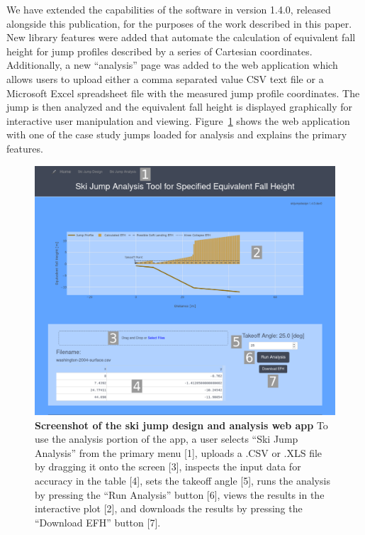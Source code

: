\documentclass[smallextended]{svjour3}       %
\begin{document}
We have extended the capabilities of the software in version 1.4.0, released
alongside this publication, for the purposes of the work described in this
paper. New library features were added that automate the calculation of
equivalent fall height for jump profiles described by a series of Cartesian
coordinates. Additionally, a new ``analysis'' page was added to the web
application which allows users to upload either a comma separated value CSV
text file or a Microsoft Excel spreadsheet file with the measured jump profile
coordinates. The jump is then analyzed and the equivalent fall height is
displayed graphically for interactive user manipulation and viewing.
Figure~\ref{fig:web-app-screenshot} shows the web application with one of the
case study jumps loaded for analysis and explains the primary features.
%
\begin{figure}
  \centering
  \includegraphics[width=\textwidth]{figures/web-app-screenshot.png}
  \caption{\textbf{Screenshot of the ski jump design and analysis web app} To
    use the analysis portion of the app, a user selects ``Ski Jump Analysis''
    from the primary menu [1], uploads a .CSV or .XLS file by dragging it onto
    the screen [3], inspects the input data for accuracy in the table [4], sets
    the takeoff angle [5], runs the analysis by pressing the ``Run Analysis''
    button [6], views the results in the interactive plot [2], and downloads
    the results by pressing the ``Download EFH'' button [7].}
  \label{fig:web-app-screenshot}
\end{figure}
\end{document}
